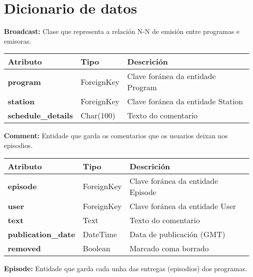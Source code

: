 \chapter[Apéndice]{
  \label{chp:dicionario}
  Dicionario de datos
}

\textbf{Broadcast:} Clase que representa a relación N-N de emisión entre programas e emisoras.

\begin{tabular}{|p{3cm}|p{3cm}|p{8cm}|}
	\hline
	Atributo & Tipo & Descrición\\
	\hline
	\textbf{program} & ForeignKey & Clave foránea da entidade Program\\
	\hline
	\textbf{station} & ForeignKey & Clave foránea da entidade Station\\	
	\hline
	\textbf{schedule\_details} & Char(100) & Texto do comentario\\
	\hline
\end{tabular}


\textbf{Comment:} Entidade que garda os comentarios que os usuarios deixan nos episodios.

\begin{tabular}{|p{3cm}|p{3cm}|p{8cm}|}
	\hline
	Atributo & Tipo & Descrición\\
	\hline
	\textbf{episode} & ForeignKey & Clave foránea da entidade Episode\\
	\hline
	\textbf{user} & ForeignKey & Clave foránea da entidade User\\	
	\hline
	\textbf{text} & Text & Texto do comentario\\
	\hline
	\textbf{publication\_date} & DateTime & Data de publicación (GMT)\\
	\hline
	\textbf{removed} & Boolean & Marcado coma borrado\\
	\hline
\end{tabular}



\textbf{Episode:} Entidade que garda cada unha das entregas (episodios) dos programas.


